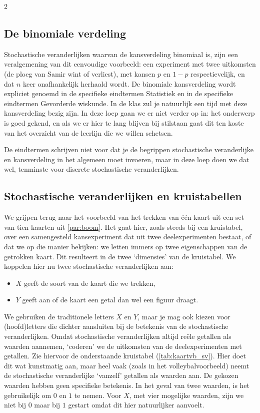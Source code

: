 \begin{multicols}{2}
\subsection*{De binomiale verdeling}

Stochastische veranderlijken waarvan de kansverdeling binomiaal is, zijn een veralgemening van dit eenvoudige voorbeeld: een experiment met twee uitkomsten (de ploeg van Samir wint of verliest), met kansen $p$ en $1-p$ respectievelijk, en dat $n$ keer onafhankelijk herhaald wordt. De binomiale kansverdeling wordt expliciet genoemd in de specifieke eindtermen Statistiek en in de specifieke eindtermen Gevorderde wiskunde. In de klas zul je natuurlijk een tijd met deze kansverdeling bezig zijn. In deze loep gaan we er niet verder op in: het onderwerp is goed gekend, en als we er hier te lang blijven bij stilstaan gaat dit ten koste van het overzicht van de leerlijn die we willen schetsen.

De eindtermen schrijven niet voor dat je de begrippen stochastische veranderlijke en kansverdeling in het algemeen moet invoeren, maar in deze loep doen we dat wel, tenminste voor discrete stochastische veranderlijken.

\subsection{Stochastische veranderlijken en kruistabellen}

We grijpen terug naar het voorbeeld van het trekken van één kaart uit een set van tien kaarten uit \autoref{par:boom}. Het gaat hier, zoals steeds bij een kruistabel, over een samengesteld kansexperiment dat uit twee deelexperimenten bestaat, of dat we op die manier bekijken: we letten immers op twee eigenschappen van de getrokken kaart. Dit resulteert in de twee ‘dimensies’ van de kruistabel. We koppelen hier nu twee stochastische veranderlijken aan:
\begin{itemize}
    \item $X$ geeft de soort van de kaart die we trekken, 
    \item $Y$ geeft aan of de kaart een getal dan wel een figuur draagt.
\end{itemize}

We gebruiken de traditionele letters $X$ en $Y$, maar je mag ook kiezen voor (hoofd)letters die dichter aansluiten bij de betekenis van de stochastische veranderlijken. Omdat stochastische veranderlijken altijd reële getallen als waarden aannemen, ‘coderen’ we de uitkomsten van de deelexperimenten met getallen. Zie hiervoor de onderstaande kruistabel (\autoref{tab:kaartvb_sv}). Hier doet dit wat kunstmatig aan, maar heel vaak (zoals in het volleybalvoorbeeld) neemt de stochastische veranderlijke ‘vanzelf’ getallen als waarden aan. De gekozen waarden hebben geen specifieke betekenis. In het geval van twee waarden, is het gebruikelijk om $0$ en $1$ te nemen. Voor $X$, met vier mogelijke waarden, zijn we niet bij $0$ maar bij $1$ gestart omdat dit hier natuurlijker aanvoelt. 


\end{multicols}
